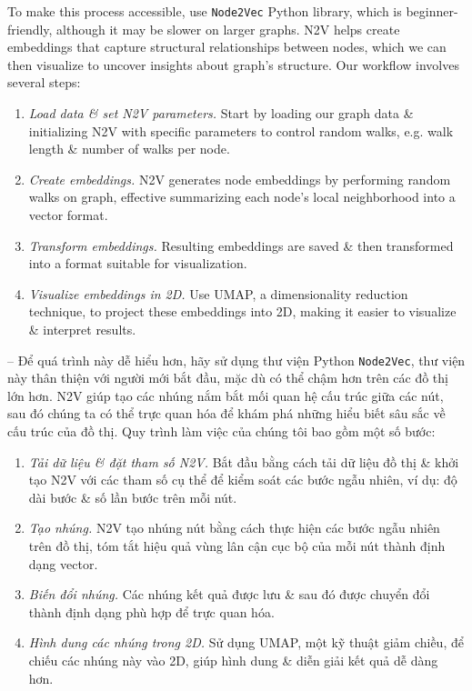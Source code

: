 \documentclass{article}
\begin{document}
\begin{itemize}
\begin{itemize}
        To make this process accessible, use {\tt Node2Vec} Python library, which is beginner-friendly, although it may be slower on larger graphs. N2V helps create embeddings that capture structural relationships between nodes, which we can then visualize to uncover insights about graph's structure. Our workflow involves several steps:
        \begin{enumerate}
            \item {\it Load data \& set N2V parameters.} Start by loading our graph data \& initializing N2V with specific parameters to control random walks, e.g. walk length \& number of walks per node.
            \item {\it Create embeddings.} N2V generates node embeddings by performing random walks on graph, effective summarizing each node's local neighborhood into a vector format.
            \item {\it Transform embeddings.} Resulting embeddings are saved \& then transformed into a format suitable for visualization.
            \item {\it Visualize embeddings in 2D.} Use UMAP, a dimensionality reduction technique, to project these embeddings into 2D, making it easier to visualize \& interpret results.
        \end{enumerate}
        -- Để quá trình này dễ hiểu hơn, hãy sử dụng thư viện Python {\tt Node2Vec}, thư viện này thân thiện với người mới bắt đầu, mặc dù có thể chậm hơn trên các đồ thị lớn hơn. N2V giúp tạo các nhúng nắm bắt mối quan hệ cấu trúc giữa các nút, sau đó chúng ta có thể trực quan hóa để khám phá những hiểu biết sâu sắc về cấu trúc của đồ thị. Quy trình làm việc của chúng tôi bao gồm một số bước:
        \begin{enumerate}
            \item {\it Tải dữ liệu \& đặt tham số N2V.} Bắt đầu bằng cách tải dữ liệu đồ thị \& khởi tạo N2V với các tham số cụ thể để kiểm soát các bước ngẫu nhiên, ví dụ: độ dài bước \& số lần bước trên mỗi nút.
            \item {\it Tạo nhúng.} N2V tạo nhúng nút bằng cách thực hiện các bước ngẫu nhiên trên đồ thị, tóm tắt hiệu quả vùng lân cận cục bộ của mỗi nút thành định dạng vector.
            \item {\it Biến đổi nhúng.} Các nhúng kết quả được lưu \& sau đó được chuyển đổi thành định dạng phù hợp để trực quan hóa.
            \item {\it Hình dung các nhúng trong 2D.} Sử dụng UMAP, một kỹ thuật giảm chiều, để chiếu các nhúng này vào 2D, giúp hình dung \& diễn giải kết quả dễ dàng hơn.

\end{enumerate}
\end{itemize}
\end{itemize}
\end{document}
